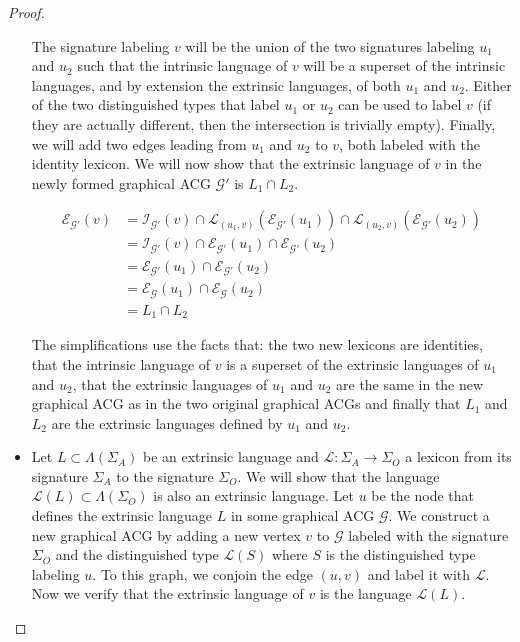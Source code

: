 \begin{proof}
\begin{itemize}
      The signature labeling $v$ will be the union of the two signatures
      labeling $u_1$ and $u_2$ such that the intrinsic language of $v$
      will be a superset of the intrinsic languages, and by extension
      the extrinsic languages, of both $u_1$ and $u_2$. Either of the
      two distinguished types that label $u_1$ or $u_2$ can be used to
      label $v$ (if they are actually different, then the intersection
      is trivially empty). Finally, we will add two edges leading from
      $u_1$ and $u_2$ to $v$, both labeled with the identity lexicon. We
      will now show that the extrinsic language of $v$ in the newly
      formed graphical ACG $\mathcal{G}'$ is $L_1 \cap L_2$.

      \begin{align*}
        \mathcal{E}_{\mathcal{G}'}(v) &= \mathcal{I}_{\mathcal{G}'}(v)
        \cap \mathcal{L}_{(u_1,v)}(\mathcal{E}_{\mathcal{G}'}(u_1)) \cap
        \mathcal{L}_{(u_2,v)}(\mathcal{E}_{\mathcal{G}'}(u_2)) \\ &=
        \mathcal{I}_{\mathcal{G}'}(v) \cap
        \mathcal{E}_{\mathcal{G}'}(u_1) \cap
        \mathcal{E}_{\mathcal{G}'}(u_2) \\ &=
        \mathcal{E}_{\mathcal{G}'}(u_1) \cap
        \mathcal{E}_{\mathcal{G}'}(u_2) \\ &=
        \mathcal{E}_{\mathcal{G}}(u_1) \cap
        \mathcal{E}_{\mathcal{G}}(u_2) \\ &= L_1 \cap L_2
      \end{align*}

      The simplifications use the facts that: the two new lexicons are
      identities, that the intrinsic language of $v$ is a superset of
      the extrinsic languages of $u_1$ and $u_2$, that the extrinsic
      languages of $u_1$ and $u_2$ are the same in the new graphical ACG
      as in the two original graphical ACGs and finally that $L_1$ and
      $L_2$ are the extrinsic languages defined by $u_1$ and $u_2$.

  \item Let $L \subset \Lambda(\Sigma_A)$ be an extrinsic language and
    $\mathcal{L} : \Sigma_A \to \Sigma_O$ a lexicon from its signature
    $\Sigma_A$ to the signature $\Sigma_O$. We will show that the
    language $\mathcal{L}(L) \subset \Lambda(\Sigma_O)$ is also an
    extrinsic language. Let $u$ be the node that defines the extrinsic
    language $L$ in some graphical ACG $\mathcal{G}$. We construct a new
    graphical ACG by adding a new vertex $v$ to $\mathcal{G}$ labeled
    with the signature $\Sigma_O$ and the distinguished type
    $\mathcal{L}(S)$ where $S$ is the distinguished type labeling
    $u$. To this graph, we conjoin the edge $(u,v)$ and label it with
    $\mathcal{L}$. Now we verify that the extrinsic language of $v$ is
    the language $\mathcal{L}(L).$


\end{itemize}
\end{proof}
